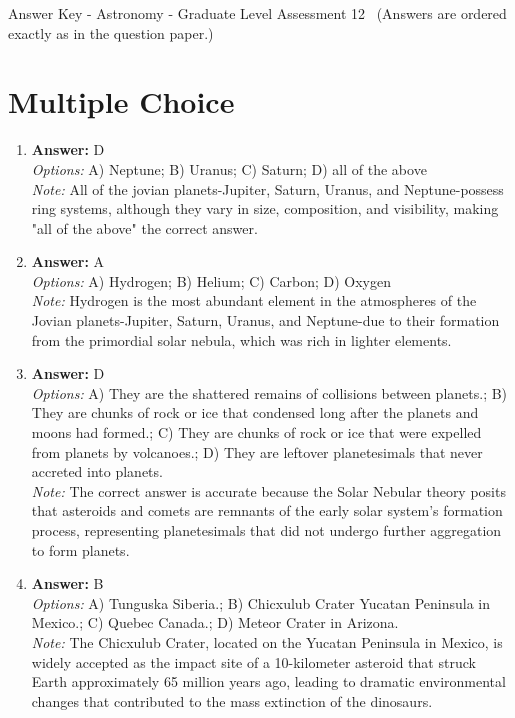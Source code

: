 \documentclass[12pt]{article}
\begin{document}
\begin{center}
Answer Key - Astronomy - Graduate Level Assessment 12 \
\small (Answers are ordered exactly as in the question paper.)
\end{center}

\section*{Multiple Choice}
\begin{enumerate}[label=\arabic*.]
\item \textbf{Answer:} D
\\ \textit{Options:} A) Neptune; B) Uranus; C) Saturn; D) all of the above
\\ \textit{Note:} All of the jovian planets-Jupiter, Saturn, Uranus, and Neptune-possess ring systems, although they vary in size, composition, and visibility, making "all of the above" the correct answer.
\item \textbf{Answer:} A
\\ \textit{Options:} A) Hydrogen; B) Helium; C) Carbon; D) Oxygen
\\ \textit{Note:} Hydrogen is the most abundant element in the atmospheres of the Jovian planets-Jupiter, Saturn, Uranus, and Neptune-due to their formation from the primordial solar nebula, which was rich in lighter elements.
\item \textbf{Answer:} D
\\ \textit{Options:} A) They are the shattered remains of collisions between planets.; B) They are chunks of rock or ice that condensed long after the planets and moons had formed.; C) They are chunks of rock or ice that were expelled from planets by volcanoes.; D) They are leftover planetesimals that never accreted into planets.
\\ \textit{Note:} The correct answer is accurate because the Solar Nebular theory posits that asteroids and comets are remnants of the early solar system's formation process, representing planetesimals that did not undergo further aggregation to form planets.
\item \textbf{Answer:} B
\\ \textit{Options:} A) Tunguska Siberia.; B) Chicxulub Crater Yucatan Peninsula in Mexico.; C) Quebec Canada.; D) Meteor Crater in Arizona.
\\ \textit{Note:} The Chicxulub Crater, located on the Yucatan Peninsula in Mexico, is widely accepted as the impact site of a 10-kilometer asteroid that struck Earth approximately 65 million years ago, leading to dramatic environmental changes that contributed to the mass extinction of the dinosaurs.

\end{enumerate}
\end{document}
